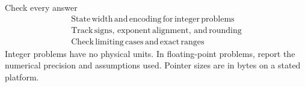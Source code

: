 \documentclass[11pt]{article}
\begin{document}
\begin{keepsection}
\begin{equationcard}{Check every answer}
\[ \begin{gathered} \text{State}\, \text{width}\, \text{and}\, \text{encoding}\, \text{for}\, \text{integer}\, \text{problems} \\ \text{Track}\, \text{signs},\, \text{exponent}\, \text{alignment},\, \text{and}\, \text{rounding} \\ \text{Check}\, \text{limiting}\, \text{cases}\, \text{and}\, \text{exact}\, \text{ranges} \end{gathered} \]
{\small Integer problems have no physical units. In floating-point problems, report the numerical precision and assumptions used. Pointer sizes are in bytes on a stated platform.}
\end{equationcard}
\end{keepsection}
\end{document}
